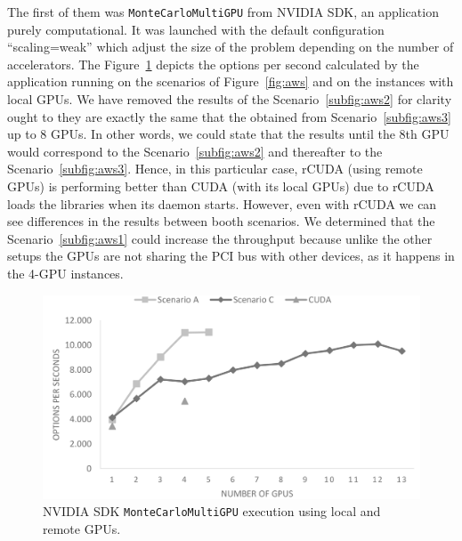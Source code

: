 \documentclass[a4paper,twoside]{article}
\begin{document}
The first of them was {\tt MonteCarloMultiGPU} from NVIDIA SDK, an application purely computational. 
It was launched with the default configuration ``scaling=weak'' which adjust the size of the problem depending on the number of accelerators.
The Figure~\ref{fig:mont-opt} depicts the options per second calculated by the application running on the scenarios of Figure~\ref{fig:aws} and on the instances with local GPUs. 
We have removed the results of the Scenario~\ref{subfig:aws2} for clarity ought to they are exactly the same that the obtained from Scenario~\ref{subfig:aws3} up to 8 GPUs. 
In other words, we could state that the results until the 8th GPU would correspond to the Scenario~\ref{subfig:aws2} and thereafter to the Scenario~\ref{subfig:aws3}.
Hence, in this particular case, rCUDA (using remote GPUs) is performing better than CUDA (with its local GPUs) due to rCUDA loads the libraries when its daemon starts.
However, even with rCUDA we can see differences in the results between booth scenarios. We determined that the Scenario~\ref{subfig:aws1} could increase the throughput because
unlike the other setups the GPUs are not sharing the PCI bus with other devices, as it happens in the 4-GPU instances.
\begin{figure}[htb]
  \centering
  \includegraphics[width=\linewidth]{images/mont.pdf}
  \caption{NVIDIA SDK {\tt MonteCarloMultiGPU} execution using local and remote GPUs.}
  \label{fig:mont-opt}
\end{figure}
\end{document}
